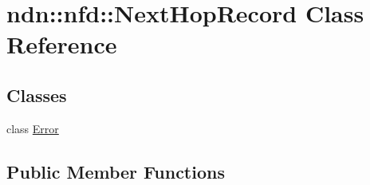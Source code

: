 \hypertarget{classndn_1_1nfd_1_1NextHopRecord}{}\section{ndn\+:\+:nfd\+:\+:Next\+Hop\+Record Class Reference}
\label{classndn_1_1nfd_1_1NextHopRecord}
\subsection*{Classes}
\begin{DoxyCompactItemize}
\item 
class \hyperlink{classndn_1_1nfd_1_1NextHopRecord_1_1Error}{Error}
\end{DoxyCompactItemize}
\subsection*{Public Member Functions}
